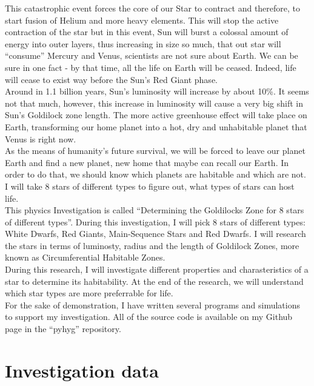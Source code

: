 \documentclass{article}
\begin{document}
This catastrophic event forces the core of our Star to contract and therefore, to start fusion of Helium and more heavy elements. This will stop the active contraction of the star but in this event, Sun will burst a colossal amount of energy into outer layers, thus increasing in size so much, that out star will ``consume'' Mercury and Venus, scientists are not sure about Earth. We can be sure in one fact -  by that time, all the life on Earth will be ceased. Indeed, life will cease to exist way before the Sun's Red Giant phase.\\

Around in 1.1 billion years, Sun's luminosity will increase by about 10\%. It seems not that much, however, this increase in luminosity will cause a very big shift in Sun's Goldilock zone length. The more active greenhouse effect will take place on Earth, transforming our home planet into a hot, dry and unhabitable planet that Venus is right now.~\cite{sun}\\

As the means of humanity's future survival, we will be forced to leave our planet Earth and find a new planet, new home that maybe can recall our Earth. In order to do that, we should know which planets are habitable and which are not. I will take 8 stars of different types to figure out, what types of stars can host life.\\

This physics Investigation is called ``Determining the Goldilocks Zone for 8 stars of different types''.
During this investigation, I will pick 8 stars of different types: White Dwarfs, Red Giants, Main-Sequence Stars and Red Dwarfs.
I will research the stars in terms of luminosty, radius and the length of Goldilock Zones, more known as Circumferential Habitable Zones.\\

During this research, I will investigate different properties and charasteristics of a star to determine its habitability.
At the end of the research, we will understand which star types are more preferrable for life.\\

For the sake of demonstration, I have written several programs and simulations to support my investigation. All of the source code is available on my Github page in the ``pyhyg'' repository. \cite{github}\\


\section{Investigation data}
\end{document}
